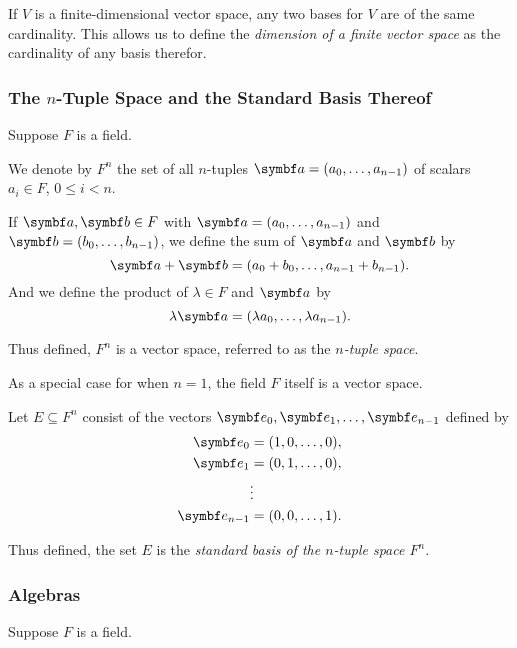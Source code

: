 If \(V\) is a finite-dimensional vector space, any two bases for \(V\) are of the same cardinality. This allows us to
define the \emph{dimension of a finite vector space} as the cardinality of any basis therefor.

\subsubsection{The \(n\)-Tuple Space and the Standard Basis Thereof}

Suppose \(F\) is a field.

\Bxm
  We denote by \(F^n\) the set of all \(n\)-tuples \(\vct{a} = (a_0, \ldots, a_{n - 1})\) of scalars \(a_i \in F\),
  \(0 \leq i < n\).

  If \(\vct{a}, \vct{b} \in F\) with \(\vct{a} = (a_0, \ldots, a_{n - 1})\) and \(\vct{b} = (b_0, \ldots, b_{n - 1})\),
  we define the sum of \(\vct{a}\) and \(\vct{b}\) by
  \[
    \vct{a} + \vct{b} = (a_0 + b_0, \ldots, a_{n - 1} + b_{n - 1}).
  \]
  And we define the product of \(\lambda \in F\) and \(\vct{a}\) by
  \[
    \lambda \vct{a} = (\lambda a_0, \ldots, \lambda a_{n - 1}).
  \]

  Thus defined, \(F^n\) is a vector space, referred to as the \emph{\(n\)-tuple space}.

  As a special case for when \(n = 1\), the field \(F\) itself is a vector space.
\Exm

\Bxm
  Let \(E \subseteq F^n\) consist of the vectors \(\vct{e}_0, \vct{e}_1, \ldots, \vct{e}_{n - 1}\) defined by
  \begin{align*}
    \vct{e}_0 & = (1, 0, \ldots, 0),\\
    \vct{e}_1 & = (0, 1, \ldots, 0),\\
    & \vdots\\
    \vct{e}_{n - 1} & = (0, 0, \ldots, 1).
  \end{align*}

  Thus defined, the set \(E\) is the \emph{standard basis of the \(n\)-tuple space \(F^n\)}.
\Exm

\subsubsection{Algebras}

Suppose \(F\) is a field.

